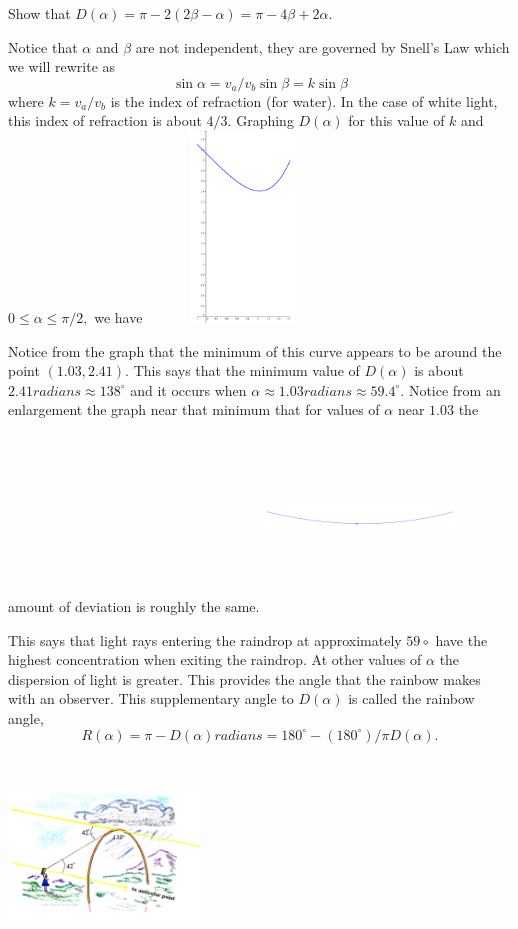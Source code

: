 \begin{myproblem}{}
  Show that $D(\alpha)=\pi-2(2\beta-\alpha)=\pi-4\beta+2\alpha.$

Notice that $\alpha$ and $\beta$ are not independent, they are governed by Snell’s Law which we will rewrite as 
$$
\sin\alpha=v_a/v_b\sin\beta=k \sin\beta
$$
where $k=v_a/v_b$  is the index of refraction (for water).  In the case of white light, this index of refraction is about $4/3.$  Graphing $D(\alpha)$ for this value of $k$ and $0\le\alpha\le \pi/2,$ we have
\includegraphics*[height=2in,width=2in]{Figures/Rainbow2}

Notice from the graph that the minimum of this curve appears to be
around the point $(1.03,2.41).$  This says that the minimum value of
$D(\alpha)$ is about $2.41 radians\approx 138^\circ $ and it occurs when $\alpha\approx 1.03
radians\approx 59.4^\circ.$  Notice from an enlargement the graph near that minimum
that for values of $\alpha$ near $1.03$ the amount of deviation is roughly the
same.
\includegraphics*[height=2in,width=2in]{Figures/Rainbow3}

This says that light rays entering the raindrop at approximately
$59\circ$ have the highest concentration when exiting the raindrop.
At other values of $\alpha$ the dispersion of light is greater.  This
provides the angle that the rainbow makes with an observer.  This
supplementary angle to $D(\alpha)$ is called the rainbow angle,
$$
R(\alpha)=\pi-D(\alpha)  radians=180^\circ-(180^\circ)/\pi D(\alpha).
$$

\includegraphics*[height=2in,width=2in]{Figures/Rainbow4}
\end{myproblem}

